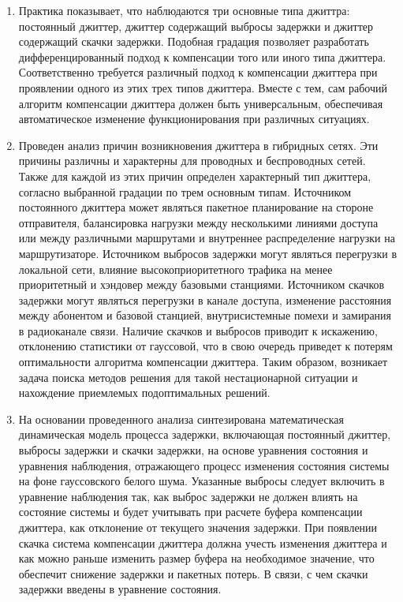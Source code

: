 \begin{enumerate}
\item 
Практика показывает, что наблюдаются три основные типа джиттра: постоянный джиттер, джиттер содержащий выбросы задержки и джиттер содержащий скачки задержки.
Подобная градация позволяет разработать дифференцированный подход к компенсации того или иного типа джиттера.
Соответственно требуется различный подход к компенсации джиттера при проявлении одного из этих трех типов джиттера.
Вместе с тем, сам рабочий алгоритм компенсации джиттера должен быть универсальным, обеспечивая автоматическое изменение функционирования при различных ситуациях.


\item Проведен анализ причин возникновения джиттера в гибридных сетях.
Эти причины различны и характерны для проводных и беспроводных сетей.
Также для каждой из этих причин определен характерный тип джиттера, согласно выбранной градации по трем основным типам.
Источником постоянного джиттера может являться пакетное планирование на стороне отправителя, балансировка нагрузки между несколькими линиями доступа или между различными маршрутами и внутреннее распределение нагрузки на маршрутизаторе.
Источником выбросов задержки могут являться перегрузки в локальной сети, влияние высокоприоритетного трафика на менее приоритетный и хэндовер между базовыми станциями.
Источником скачков задержки могут являться перегрузки в канале доступа, изменение расстояния между абонентом и базовой станцией, внутрисистемные помехи и замирания в радиоканале связи.
Наличие скачков и выбросов приводит к искажению, отклонению статистики от гауссовой, что в свою очередь приведет к потерям оптимальности алгоритма компенсации джиттера. 
Таким образом, возникает задача поиска методов решения для такой нестационарной ситуации и нахождение приемлемых подоптимальных решений.

\item На основании проведенного анализа синтезирована математическая динамическая модель процесса задержки, 
включающая постоянный джиттер, выбросы задержки и скачки задержки, на основе уравнения состояния и
уравнения наблюдения, отражающего процесс изменения состояния системы на фоне гауссовского белого шума.
Указанные выбросы следует включить в уравнение наблюдения так, как выброс задержки не должен влиять на состояние системы 
и будет учитывать при расчете буфера компенсации джиттера, как отклонение от текущего значения задержки.
При появлении скачка система компенсации джиттера должна учесть изменения джиттера и как можно раньше изменить размер буфера на необходимое значение, что обеспечит снижение задержки и пакетных потерь.
В связи, с чем скачки задержки введены в уравнение состояния.


\end{enumerate}
